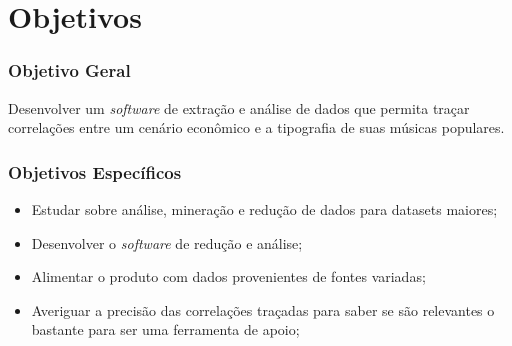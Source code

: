 \chapter{Objetivos}
\label{c.objetivos}

\subsection{Objetivo Geral}

Desenvolver um \textit{software} de extração e análise de dados que permita traçar correlações entre um cenário econômico e a tipografia de suas músicas populares.

\subsection{Objetivos Específicos}
\begin{itemize}
    \item Estudar sobre análise, mineração e redução de dados para datasets maiores;
    \item Desenvolver o \textit{software} de redução e análise;
    \item Alimentar o produto com dados provenientes de fontes variadas;
    \item Averiguar a precisão das correlações traçadas para saber se são relevantes o bastante para ser uma ferramenta de apoio;
\end{itemize}